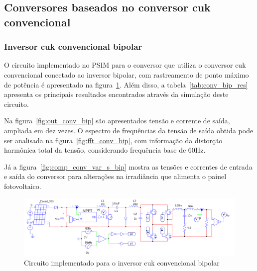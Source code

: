 \documentclass[
	12pt,				%
	openany,
	onseside,
	a4paper,			%
	english,			%
	french,				%
	spanish,			%
	brazil,				%
	]{abntex2}
\begin{document}
\subsection{Conversores baseados no conversor cuk convencional}
\subsubsection{Inversor cuk convencional bipolar}

O circuito implementado no PSIM para o conversor que utiliza o conversor cuk convencional conectado ao inversor bipolar, com rastreamento de ponto máximo de potência é apresentado na figura~\ref{fig:comp_conv_circ_clean}. Além disso, a tabela~\ref{tab:conv_bip_res} apresenta os principais resultados encontrados através da simulação deste circuito.

Na figura~\ref{fig:out_conv_bip} são apresentados tensão e corrente de saída, ampliada em dez vezes. O espectro de frequências da tensão de saída obtida pode ser analisada na figura~\ref{fig:fft_conv_bip},  com informação da distorção harmônica total da tensão, considerando frequência base de 60Hz.

Já a figura~\ref{fig:comp_conv_var_s_bip} mostra as tensões e correntes de entrada e saída do conversor para alterações na irradiância que alimenta o painel fotovoltaico.

\begin{figure}[H]%
	\captionsetup{justification=centering}
	\centering
		\includegraphics[width= \linewidth]{comp_conv_circ_clean}
		\caption{Circuito implementado para o inversor cuk convencional bipolar}
		\label{fig:comp_conv_circ_clean}
\end{figure}
\end{document}
